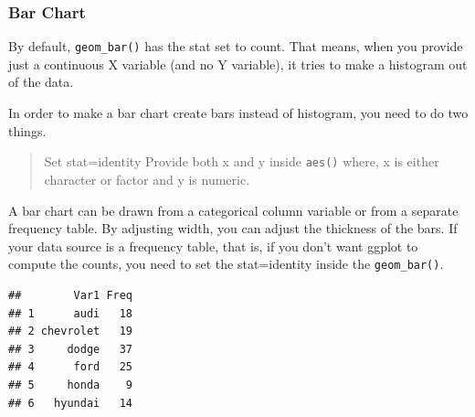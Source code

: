 \documentclass[a4paper]{article}
\newenvironment{Shaded}{}{}
\newcommand{\KeywordTok}[1]{\textcolor[rgb]{0.00,0.00,1.00}{#1}}
\newcommand{\StringTok}[1]{\textcolor[rgb]{0.00,0.50,0.50}{#1}}
\newcommand{\CommentTok}[1]{\textcolor[rgb]{0.00,0.50,0.00}{#1}}
\newcommand{\OperatorTok}[1]{#1}
\newcommand{\NormalTok}[1]{#1}
\begin{document}
\newpage  

\subsubsection{Bar Chart}\label{bar-chart}

By default, \texttt{geom\_bar()} has the stat set to count. That means,
when you provide just a continuous X variable (and no Y variable), it
tries to make a histogram out of the data.

In order to make a bar chart create bars instead of histogram, you need
to do two things.

\begin{quote}
Set stat=identity Provide both x and y inside \texttt{aes()} where, x is
either character or factor and y is numeric.
\end{quote}

A bar chart can be drawn from a categorical column variable or from a
separate frequency table. By adjusting width, you can adjust the
thickness of the bars. If your data source is a frequency table, that
is, if you don't want ggplot to compute the counts, you need to set the
stat=identity inside the \texttt{geom\_bar()}.

\begin{Shaded}
\end{Shaded}

\begin{verbatim}
##        Var1 Freq
## 1      audi   18
## 2 chevrolet   19
## 3     dodge   37
## 4      ford   25
## 5     honda    9
## 6   hyundai   14
\end{verbatim}
\end{document}
